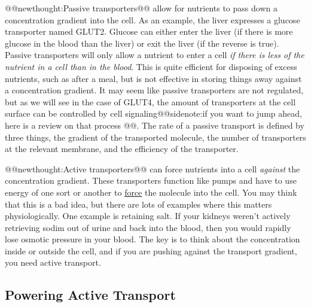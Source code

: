 \documentclass{tufte-handout}
\makeatletter
\def\newthought#1{@@newthought:#1@@}
\def\sidenote#1{@@sidenote:#1@@}
\makeatother
\begin{document}
\newthought{Passive transporters} allow for nutrients to pass down a concentration gradient into the cell.  As an example, the liver expresses a glucose transporter named GLUT2.  Glucose can either enter the liver (if there is more glucose in the blood than the liver) or exit the liver (if the reverse is true).  Passive transporters will only allow a nutrient to enter a cell \emph{if there is less of the nutrient in a cell than in the blood}.  This is quite efficient for disposing of excess nutrients, such as after a meal, but is not effective in storing things away against a concentration gradient.  It may seem like passive transporters are not regulated, but as we will see in the case of GLUT4, the amount of transporters at the cell surface can be controlled by cell signaling\sidenote{if you want to jump ahead, here is a review on that process \citep{Leto2012}}.  The rate of a passive transport is defined by three things, the gradient of the transported molecule, the number of transporters at the relevant membrane, and the efficiency of the transporter.

\newthought{Active transporters} can force nutrients into a cell \emph{against} the concentration gradient.  These transporters function like pumps and have to use energy of one sort or another to \underline{force} the molecule into the cell.  You may think that this is a bad idea, but there are lots of examples where this matters physiologically.  One example is retaining salt.  If your kidneys weren't actively retrieving sodim out of urine and back into the blood, then you would rapidly lose osmotic pressure in your blood. The key is to think about the concentration inside or outside the cell, and if you are pushing against the transport gradient, you need active transport.

\subsection{Powering Active Transport}
\end{document}

